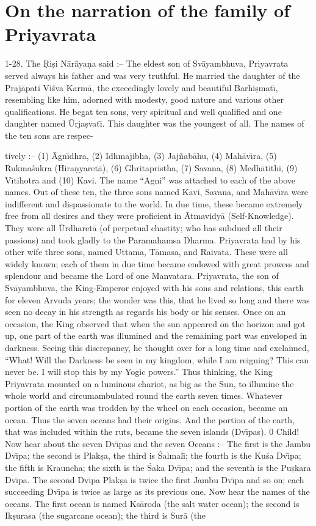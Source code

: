 \chapter{On the narration of the family of Priyavrata}

1-28. The \d{R}i\d{s}i N\=ar\=aya\d{n}a said :-- The eldest son of Sv\=ayambhuva, Priyavrata served always his father and was very truthful. He married the daughter of the Praj\=apati Vi\'sva Karm\=a, the exceedingly lovely and beautiful Barhi\d{s}mat\={\i}, resembling like him, adorned with modesty, good nature and various other qualifications. He begat ten sons, very spiritual and well qualified and one daughter named \=Urja\d{s}vat\={\i}. This daughter was the youngest of all. The names of the ten sons are respec-

tively :-- (1) \=Agn\={\i}dhra, (2) Idhmajibha, (3) Jaj\~nab\=ahu, (4) Mah\=av\={\i}ra, (5) Rukma\'sukra (Hira\d{n}yaret\=a), (6) Ghritapristha, (7) Savana, (8) Medh\=atithi, (9) V\={\i}tihotra and (10) Kavi. The name ``Agni'' was attached to each of the above names. Out of these ten, the three sons named Kavi, Savana, and Mah\=av\={\i}ra were indifferent and dispassionate to the world. In due time, these became extremely free from all desires and they were proficient in \=Atmavidy\=a (Self-Knowledge). They were all \=Urdharet\=a (of perpetual chastity; who has subdued all their passions) and took gladly to the Paramahamsa Dharma. Priyavrata had by his other wife three sons, named Uttama, T\=amasa, and Raivata. These were all widely known; each of them in due time became endowed with great prowess and splendour and became the Lord of one Manvatara. Priyavrata, the son of Sv\=ayambhuva, the King-Emperor enjoyed with his sons and relations, this earth for eleven Arvuda years; the wonder was this, that he lived so long and there was seen no decay in his strength as regards his body or his senses. Once on an occasion, the King observed that when the sun appeared on the horizon and got up, one part of the earth was illumined and the remaining part was enveloped in darkness. Seeing this discrepancy, he thought over for a long time and exclaimed, ``What! Will the Darkness be seen in my kingdom, while I am reigning? This can never be. I will stop this by my Yogic powers.'' Thus thinking, the King Priyavrata mounted on a luminous chariot, as big as the Sun, to illumine the whole world and circumambulated round the earth seven times. Whatever portion of the earth was trodden by the wheel on each occasion, became an ocean. Thus the seven oceans had their origins. And the portion of the earth, that was included within the ruts, became the seven islands (Dv\={\i}pas). 0 Child! Now hear about the seven Dv\={\i}pas and the seven Oceans :-- The first is the Jambu Dv\={\i}pa; the second is Plak\d{s}a, the third is \'Salmal\={\i}; the fourth is the Ku\'sa Dv\={\i}pa; the fifth is Krauncha; the sixth is the \'Saka Dv\={\i}pa; and the seventh is the Pu\d{s}kara Dv\={\i}pa. The second Dv\={\i}pa Plak\d{s}a is twice the first Jambu Dv\={\i}pa and so on; each succeeding Dv\={\i}pa is twice as large as its previous one. Now hear the names of the oceans. The first ocean is named Ks\=aroda (the salt water ocean); the second is Ik\d{s}urasa (the sugarcane ocean); the third is Sur\=a (the 